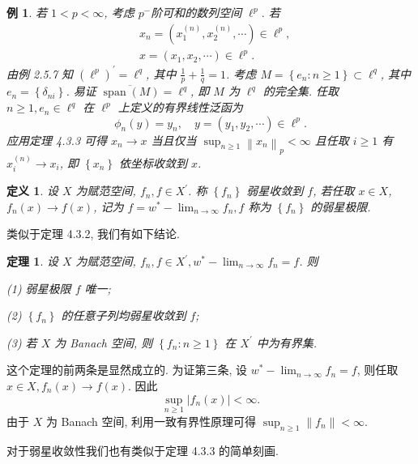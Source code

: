 \documentclass[openany]{ctexbook}
\makeatletter
\theoremstyle{kaiti}
\newtheorem{definition}{定义}[section]
\newtheorem{theorem}{定理}[section]
\theoremstyle{normal}
\newtheorem{example}{例}[section]
\renewenvironment{proof}[1][\proofname]{\par
    \pushQED{\qed}%
    \normalfont \topsep6\p@\@plus6\p@\relax
    \trivlist
    \item\relax
    {\heiti #1}\hspace{2\labelsep}\ignorespaces
  }{%
    \popQED\endtrivlist\@endpefalse
  }
\makeatother
\begin{document}
\begin{example}
若 $1<p<\infty$, 考虑 $p^{-}$阶可和的数列空间 $\ell^{p}$. 若
$$
\begin{aligned}
&x_n=\left(x_1^{(n)}, x_2^{(n)}, \cdots\right) \in \ell^{p}, \\
&x=\left(x_1, x_2, \cdots\right) \in \ell^{p}.
\end{aligned}
$$
由例 2.5.7 知 $\left(\ell^{p}\right)^{\prime}=\ell^{q}$, 其中 $\frac{1}{p}+\frac{1}{q}=1$. 考虑 $M=\left\{e_n: n \geqslant 1\right\} \subset \ell^{q}$, 其中 $e_n=\left\{\delta_{n i}\right\}$. 易证 $\overline{\operatorname{span}(M)}=\ell^{q}$, 即 $M$ 为 $\ell^{q}$ 的完全集. 任取 $n \geqslant 1, e_n \in \ell^{q}$ 在 $\ell^{p}$ 上定义的有界线性泛函为
$$
\phi_n(y)=y_n, \quad y=\left(y_1, y_2, \cdots\right) \in \ell^{p}.
$$
应用定理 4.3.3 可得 $x_n \rightarrow x$ 当且仅当 $\sup_{n \geqslant 1}\left\|x_n\right\|_{p}<\infty$ 且任取 $i \geqslant 1$ 有 $x_{i}^{(n)} \rightarrow x_{i}$, 即 $\left\{x_n\right\}$ 依坐标收敛到 $x$.
\end{example}

\begin{definition}
设 $X$ 为赋范空间, $f_n, f \in X^{\prime}$. 称 $\left\{f_n\right\}$ 弱星收敛到 $f$, 若任取 $x \in X$, $f_n(x) \rightarrow f(x)$, 记为 $f=w^{*}-\lim_{n \rightarrow \infty} f_n, f$ 称为 $\left\{f_n\right\}$ 的弱星极限.
\end{definition}

类似于定理 4.3.2, 我们有如下结论.

\begin{theorem}
设 $X$ 为赋范空间, $f_n, f \in X^{\prime}, w^{*}-\lim_{n \rightarrow \infty} f_n=f$. 则

(1) 弱星极限 $f$ 唯一;

(2) $\left\{f_n\right\}$ 的任意子列均弱星收敛到 $f$;

(3) 若 $X$ 为 Banach 空间, 则 $\left\{f_n: n \geqslant 1\right\}$ 在 $X^{\prime}$ 中为有界集.
\end{theorem}

\begin{proof}
这个定理的前两条是显然成立的. 为证第三条, 设 $w^{*}-\lim_{n \rightarrow \infty} f_n=f$, 则任取 $x \in X, f_n(x) \rightarrow f(x)$. 因此
$$
\sup_{n \geqslant 1}\left|f_n(x)\right|<\infty.
$$
由于 $X$ 为 Banach 空间, 利用一致有界性原理可得 $\sup_{n \geqslant 1}\left\|f_n\right\|<\infty$.
\end{proof}

对于弱星收敛性我们也有类似于定理 4.3.3 的简单刻画.
\end{document}
